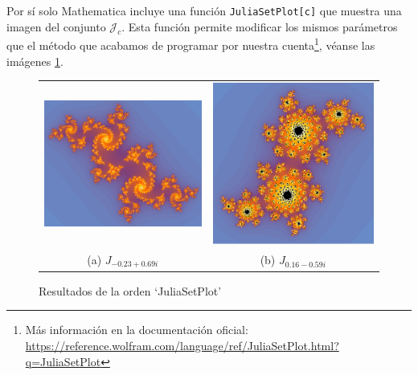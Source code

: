 Por sí solo Mathematica incluye una función \verb|JuliaSetPlot[c]| que muestra una imagen del conjunto $\mathcal{J}_c$. Esta función permite modificar los mismos parámetros que el método que acabamos de programar por nuestra cuenta\footnote{Más información en la documentación oficial: \url{https://reference.wolfram.com/language/ref/JuliaSetPlot.html?q=JuliaSetPlot}}, véanse las imágenes \ref{fig:julia-set-plot}.

\begin{figure}[ht]
  \centering
  \begin{tabular}{cc}
    \includegraphics[scale=0.4]{./img/C3/juliaSetPlot-1.png} &   \includegraphics[scale=0.3]{./img/C3/juliaSetPlot-2.png} \\
  (a) $J_{-0.23+0.69i}$ & (b) $J_{0.16-0.59i}$  \\[6pt]
  \end{tabular}
  \caption{Resultados de la orden `JuliaSetPlot'}
  \label{fig:julia-set-plot}
\end{figure}

